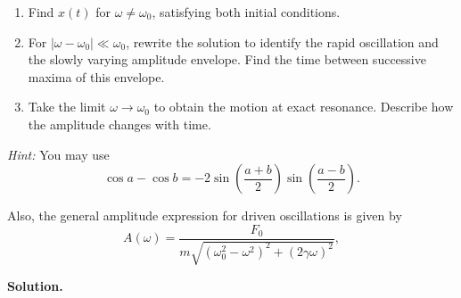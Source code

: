 \documentclass[12pt]{article}
\begin{document}
\begin{enumerate}
    \item[(a)] Find $x(t)$ for $\omega\neq\omega_0$, satisfying both
    initial conditions.

    \item[(b)] For $|\omega-\omega_0|\ll\omega_0$, rewrite the solution
    to identify the rapid oscillation and the slowly varying amplitude
    envelope. Find the time between successive maxima of this envelope.

    \item[(c)] Take the limit $\omega\to\omega_0$ to obtain the motion
    at exact resonance. Describe how the amplitude changes with time.
\end{enumerate}

\textit{Hint:} You may use
\begin{equation}
    \cos a-\cos b
    =-2\sin\left(\frac{a+b}{2}\right)
       \sin\left(\frac{a-b}{2}\right).
\end{equation}

Also, the general amplitude expression for driven oscillations is given by
\begin{equation}
    A(\omega) = \frac{F_0}{m\sqrt{(\omega_0^2-\omega^2)^2 + (2\gamma\omega)^2}},
\end{equation}


\textbf{Solution.}
\end{document}
